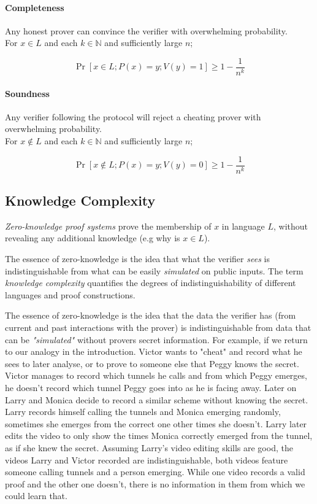 \paragraph{Completeness}

Any honest prover can convince the verifier with overwhelming probability.\\
For $x \in L$ and each $k \in \mathbb{N}$ and sufficiently large $n$;

$$\Pr[x \in L; P(x) = y; V(y) = 1] \ge 1 - \frac{1}{n^k}$$

\paragraph{Soundness}

Any verifier following the protocol will reject a cheating prover with overwhelming probability.\\
For $x \notin L$ and each $k \in \mathbb{N}$ and sufficiently large $n$;

$$\Pr[x \notin L; P(x) = y; V(y) = 0] \ge 1 - \frac{1}{n^k}$$

\subsection{Knowledge Complexity}

\textit{Zero-knowledge proof systems} prove the  membership of $x$ in language $L$, without revealing any additional knowledge (e.g why is $x \in L$).

The essence of zero-knowledge is the idea that what the verifier \textit{sees} is indistinguishable from what can be easily \textit{simulated} on public inputs.
The term \textit{knowledge complexity} quantifies the degrees of indistinguishability of different languages and proof constructions.

The essence of zero-knowledge is the idea that the data the verifier has (from current and past interactions with the prover) is indistinguishable from data that can be \textit{"simulated"} without provers secret information.
For example, if we return to our analogy in the introduction. 
Victor wants to "cheat" and record what he sees to later analyse, or to prove to someone else that Peggy knows the secret.
Victor manages to record which tunnels he calls and from which Peggy emerges, he doesn't record which tunnel Peggy goes into as he is facing away.
Later on Larry and Monica decide to record a similar scheme without knowing the secret.
Larry records himself calling the tunnels and Monica emerging randomly, sometimes she emerges from the correct one other times she doesn't. 
Larry later edits the video to only show the times Monica correctly emerged from the tunnel, as if she knew the secret.
Assuming Larry's video editing skills are good, the videos Larry and Victor recorded are indistinguishable, both videos feature someone calling tunnels and a person emerging. 
While one video records a valid proof and the other one doesn't, there is no information in them from which we could learn that.


